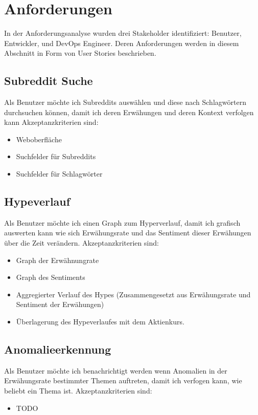 \documentclass[a4paper, 10pt, conference]{ieeeconf}
\begin{document}
\section{Anforderungen} \label{s:anforderungen}

In der Anforderungsanalyse wurden drei Stakeholder identifiziert: Benutzer, Entwickler, und DevOps Engineer.  Deren Anforderungen werden in diesem Abschnitt in Form von User Stories beschrieben.

\subsection{Subreddit Suche}

Als Benutzer möchte ich Subreddits auswählen und diese nach Schlagwörtern durchsuchen können,  damit ich deren Erwähungen und deren Kontext verfolgen kann  Akzeptanzkriterien sind:
\begin{itemize}
\item Weboberfläche 
\item Suchfelder für Subreddits
\item Suchfelder für Schlagwörter
\end{itemize}

\subsection{Hypeverlauf}

Als Benutzer möchte ich einen Graph zum Hyperverlauf,  damit ich grafisch auswerten kann wie sich Erwähungsrate und das Sentiment dieser Erwähungen über die Zeit verändern.  Akzeptanzkriterien sind:
\begin{itemize}
\item Graph der Erwähnungrate
\item Graph des Sentiments
\item Aggregierter Verlauf des Hypes (Zusammengesetzt aus Erwähungsrate und Sentiment der Erwähungen)
\item Überlagerung des Hypeverlaufes mit dem Aktienkurs.
\end{itemize}

\subsection{Anomalieerkennung}

Als Benutzer möchte ich benachrichtigt werden wenn Anomalien in der Erwähungsrate bestimmter Themen auftreten,  damit ich verfogen kann, wie beliebt ein Thema ist.  Akzeptanzkriterien sind:
\begin{itemize}
\item TODO
\end{itemize}
\end{document}
